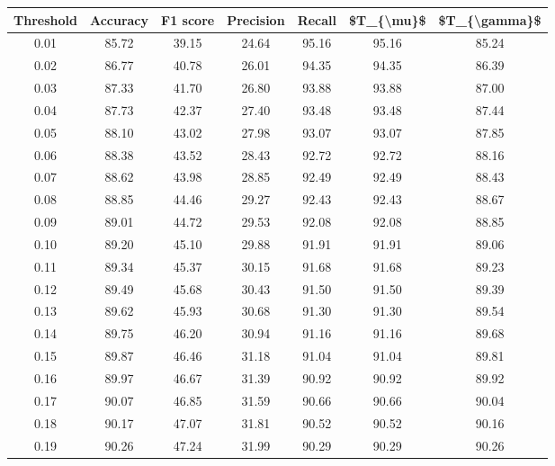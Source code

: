 \begin{tabular}{|c|c|c|c|c|c|c|}
\hline
 Threshold &  Accuracy &  F1 score &  Precision &  Recall &  \$T\_\{\textbackslash mu\}\$ &  \$T\_\{\textbackslash gamma\}\$ \\
\hline
      0.01 &     85.72 &     39.15 &      24.64 &   95.16 &      95.16 &         85.24 \\
      0.02 &     86.77 &     40.78 &      26.01 &   94.35 &      94.35 &         86.39 \\
      0.03 &     87.33 &     41.70 &      26.80 &   93.88 &      93.88 &         87.00 \\
      0.04 &     87.73 &     42.37 &      27.40 &   93.48 &      93.48 &         87.44 \\
      0.05 &     88.10 &     43.02 &      27.98 &   93.07 &      93.07 &         87.85 \\
      0.06 &     88.38 &     43.52 &      28.43 &   92.72 &      92.72 &         88.16 \\
      0.07 &     88.62 &     43.98 &      28.85 &   92.49 &      92.49 &         88.43 \\
      0.08 &     88.85 &     44.46 &      29.27 &   92.43 &      92.43 &         88.67 \\
      0.09 &     89.01 &     44.72 &      29.53 &   92.08 &      92.08 &         88.85 \\
      0.10 &     89.20 &     45.10 &      29.88 &   91.91 &      91.91 &         89.06 \\
      0.11 &     89.34 &     45.37 &      30.15 &   91.68 &      91.68 &         89.23 \\
      0.12 &     89.49 &     45.68 &      30.43 &   91.50 &      91.50 &         89.39 \\
      0.13 &     89.62 &     45.93 &      30.68 &   91.30 &      91.30 &         89.54 \\
      0.14 &     89.75 &     46.20 &      30.94 &   91.16 &      91.16 &         89.68 \\
      0.15 &     89.87 &     46.46 &      31.18 &   91.04 &      91.04 &         89.81 \\
      0.16 &     89.97 &     46.67 &      31.39 &   90.92 &      90.92 &         89.92 \\
      0.17 &     90.07 &     46.85 &      31.59 &   90.66 &      90.66 &         90.04 \\
      0.18 &     90.17 &     47.07 &      31.81 &   90.52 &      90.52 &         90.16 \\
      0.19 &     90.26 &     47.24 &      31.99 &   90.29 &      90.29 &         90.26 \\

\end{tabular}
